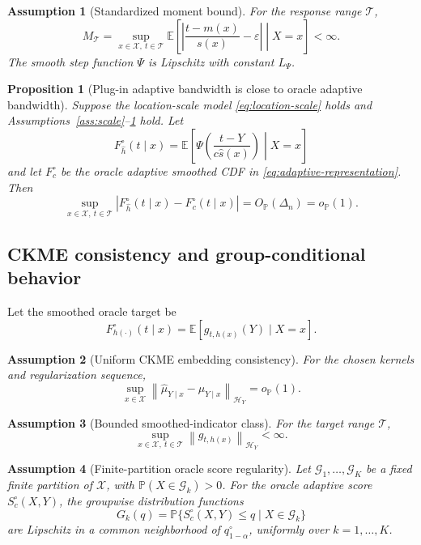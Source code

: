 \documentclass[11pt]{article}
\newtheorem{assumption}{Assumption}
\newtheorem{proposition}{Proposition}
\newcommand{\Xcal}{\mathcal X}
\newcommand{\Hcal}{\mathcal H}
\newcommand{\Gcal}{\mathcal G}
\newcommand{\Tcal}{\mathcal T}
\newcommand{\Pp}{\mathbb P}
\newcommand{\E}{\mathbb E}
\newcommand{\norm}[1]{\left\lVert #1 \right\rVert}
\newcommand{\abs}[1]{\left\lvert #1 \right\rvert}
\newcommand{\op}{o_{\mathbb P}}
\newcommand{\Op}{O_{\mathbb P}}
\begin{document}
\begin{assumption}[Standardized moment bound]
\label{ass:std-moment}
For the response range \(\Tcal\),
\[
  M_{\Tcal}
  =
  \sup_{x\in\Xcal,\ t\in\Tcal}
  \E\left[
  \abs{\frac{t-m(x)}{s(x)}-\varepsilon}
  \middle|X=x
  \right]
  <\infty.
\]
The smooth step function \(\Psi\) is Lipschitz with constant \(L_\Psi\).
\end{assumption}

\begin{proposition}[Plug-in adaptive bandwidth is close to oracle adaptive bandwidth]
\label{prop:plugin-oracle}
Suppose the location-scale model \eqref{eq:location-scale} holds and Assumptions~\ref{ass:scale}--\ref{ass:std-moment} hold. Let
\[
  F_{\widehat h}^{\circ}(t\mid x)
  =
  \E\left[
  \Psi\!\left(\frac{t-Y}{c\widehat s(x)}\right)
  \middle|X=x
  \right]
\]
and let \(F_c^\circ\) be the oracle adaptive smoothed CDF in \eqref{eq:adaptive-representation}. Then
\[
  \sup_{x\in\Xcal,\ t\in\Tcal}
  \abs{F_{\widehat h}^{\circ}(t\mid x)-F_c^\circ(t\mid x)}
  =
  \Op(\Delta_n)
  =
  \op(1).
\]
\end{proposition}

\subsection{CKME consistency and group-conditional behavior}

Let the smoothed oracle target be
\[
  F_{h(\cdot)}^\circ(t\mid x)=
  \E[g_{t,h(x)}(Y)\mid X=x].
\]

\begin{assumption}[Uniform CKME embedding consistency]
\label{ass:ckme}
For the chosen kernels and regularization sequence,
\[
  \sup_{x\in\Xcal}
  \norm{\widehat\mu_{Y\mid x}-\mu_{Y\mid x}}_{\Hcal_Y}
  =\op(1).
\]
\end{assumption}

\begin{assumption}[Bounded smoothed-indicator class]
\label{ass:g}
For the target range \(\Tcal\),
\[
  \sup_{x\in\Xcal,\ t\in\Tcal}
  \norm{g_{t,h(x)}}_{\Hcal_Y}<\infty.
\]
\end{assumption}

\begin{assumption}[Finite-partition oracle score regularity]
\label{ass:group}
Let \(\Gcal_1,\ldots,\Gcal_K\) be a fixed finite partition of \(\Xcal\), with \(\Pp(X\in\Gcal_k)>0\). For the oracle adaptive score \(S_c^\circ(X,Y)\), the groupwise distribution functions
\[
  G_k(q)=\Pp\{S_c^\circ(X,Y)\le q\mid X\in\Gcal_k\}
\]
are Lipschitz in a common neighborhood of \(q^\circ_{1-\alpha}\), uniformly over \(k=1,\ldots,K\).
\end{assumption}
\end{document}
